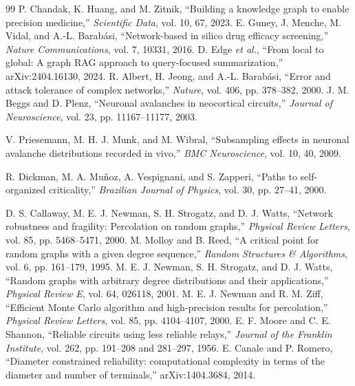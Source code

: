 \documentclass[11pt]{article}
\begin{document}








\clearpage
\begin{thebibliography}{99}
 P. Chandak, K. Huang, and M. Zitnik, ``Building a knowledge graph to enable precision medicine,'' \textit{Scientific Data}, vol. 10, 67, 2023.
 E. Guney, J. Menche, M. Vidal, and A.-L. Barab\'asi, ``Network-based in silico drug efficacy screening,'' \textit{Nature Communications}, vol. 7, 10331, 2016.
 D. Edge \textit{et al.}, ``From local to global: A graph RAG approach to query-focused summarization,'' arXiv:2404.16130, 2024.
 R. Albert, H. Jeong, and A.-L. Barab\'asi, ``Error and attack tolerance of complex networks,'' \textit{Nature}, vol. 406, pp. 378--382, 2000.
J. M. Beggs and D. Plenz, ``Neuronal avalanches in neocortical circuits,''
\textit{Journal of Neuroscience}, vol. 23, pp. 11167--11177, 2003.

V. Priesemann, M. H. J. Munk, and M. Wibral, ``Subsampling effects in neuronal
avalanche distributions recorded in vivo,'' \textit{BMC Neuroscience}, vol. 10,
40, 2009.

R. Dickman, M. A. Mu\~noz, A. Vespignani, and S. Zapperi, ``Paths to
self-organized criticality,'' \textit{Brazilian Journal of Physics}, vol. 30,
pp. 27--41, 2000.

 D. S. Callaway, M. E. J. Newman, S. H. Strogatz, and D. J. Watts, ``Network robustness and fragility: Percolation on random graphs,'' \textit{Physical Review Letters}, vol. 85, pp. 5468--5471, 2000.
 M. Molloy and B. Reed, ``A critical point for random graphs with a given degree sequence,'' \textit{Random Structures \& Algorithms}, vol. 6, pp. 161--179, 1995.
 M. E. J. Newman, S. H. Strogatz, and D. J. Watts, ``Random graphs with arbitrary degree distributions and their applications,'' \textit{Physical Review E}, vol. 64, 026118, 2001.
 M. E. J. Newman and R. M. Ziff, ``Efficient Monte Carlo algorithm and high-precision results for percolation,'' \textit{Physical Review Letters}, vol. 85, pp. 4104--4107, 2000.
 E. F. Moore and C. E. Shannon, ``Reliable circuits using less reliable relays,'' \textit{Journal of the Franklin Institute}, vol. 262, pp. 191--208 and 281--297, 1956.
E. Canale and P. Romero, ``Diameter constrained reliability: computational
complexity in terms of the diameter and number of terminals,''
arXiv:1404.3684, 2014.


\end{thebibliography}
\end{document}
